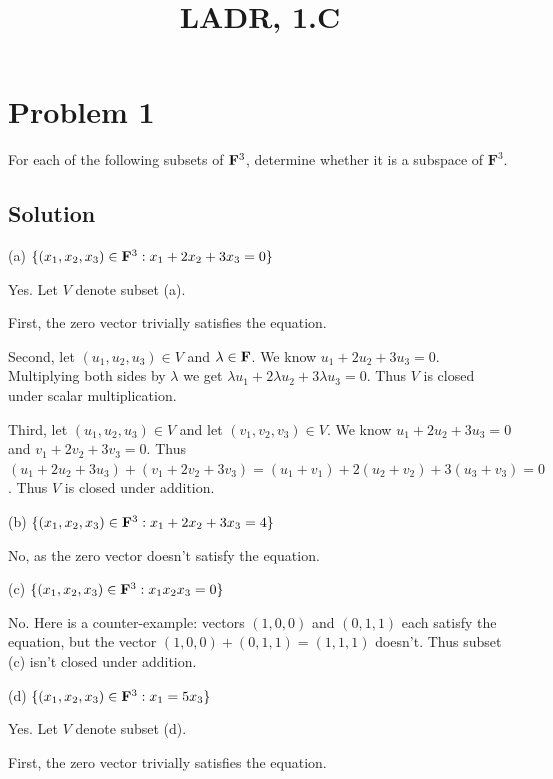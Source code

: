 \documentclass{article}
\title{LADR, 1.C}
\begin{document}
\maketitle

\section*{Problem 1}
For each of the following subsets of $\mathbf{F}^3$, determine whether it is a subspace of $\mathbf{F}^3$.

\subsection*{Solution}
(a) \qquad $\{(x_1, x_2, x_3)\in\mathbf{F}^3:x_1+2x_2+3x_3=0\}$

Yes. Let $V$ denote subset (a).

\vs

First, the zero vector trivially satisfies the equation.

\vs

Second, let $(u_1, u_2, u_3)\in V$ and $\lambda\in\mathbf{F}$. We know $u_1+2u_2+3u_3=0$. Multiplying both sides by $\lambda$ we get $\lambda u_1+2 \lambda u_2+3\lambda u_3=0$. Thus $V$ is closed under scalar multiplication.

\vs

Third, let $(u_1, u_2, u_3)\in V$ and let $(v_1, v_2, v_3)\in V$. We know $u_1+2u_2+3u_3=0$ and $v_1+2v_2+3v_3=0$. Thus $(u_1+2u_2+3u_3)+(v_1+2v_2+3v_3)=(u_1 + v_1)+2(u_2+v_2)+3(u_3+v_3)=0$. Thus $V$ is closed under addition.

\vs

(b) \qquad $\{(x_1, x_2, x_3)\in\mathbf{F}^3:x_1+2x_2+3x_3=4\}$

No, as the zero vector doesn't satisfy the equation.

\vs

(c) \qquad $\{(x_1, x_2, x_3)\in\mathbf{F}^3:x_1x_2x_3=0\}$

No. Here is a counter-example: vectors $(1, 0, 0)$ and $(0, 1, 1)$ each satisfy the equation, but the vector $(1, 0, 0)+(0, 1, 1)=(1, 1, 1)$ doesn't. Thus subset (c) isn't closed under addition.

\vs

(d) \qquad $\{(x_1, x_2, x_3)\in\mathbf{F}^3:x_1=5x_3\}$

Yes. Let $V$ denote subset (d).

\vs

First, the zero vector trivially satisfies the equation.
\end{document}
